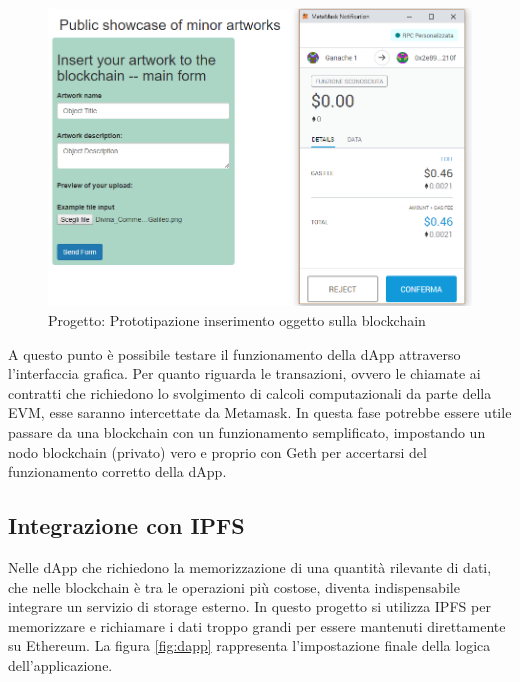 \begin{figure}[H]
\centering
\includegraphics[width=1\textwidth]{immagini/prototype.PNG}
\caption{Progetto: Prototipazione inserimento oggetto sulla blockchain}
\label{fig:Prototipo}
\end{figure}

A questo punto è possibile testare il funzionamento della dApp attraverso l'interfaccia grafica. Per quanto riguarda le transazioni, ovvero le chiamate ai contratti che richiedono lo svolgimento di calcoli computazionali da parte della EVM, esse saranno intercettate da Metamask. In questa fase potrebbe essere utile passare da una blockchain con un funzionamento semplificato, impostando un nodo blockchain (privato) vero e proprio con Geth per accertarsi del funzionamento corretto della dApp.

\subsection{Integrazione con IPFS}

Nelle dApp che richiedono la memorizzazione di una quantità rilevante di dati, che nelle blockchain è tra le operazioni più costose, diventa indispensabile integrare un servizio di storage esterno. In questo progetto si utilizza IPFS per memorizzare e richiamare i dati troppo grandi per essere mantenuti direttamente su Ethereum. La figura \ref{fig:dapp} rappresenta l'impostazione finale della logica dell’applicazione.


